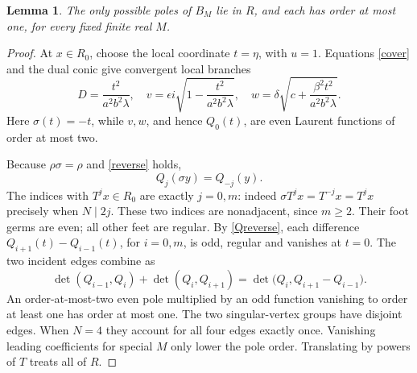 \documentclass[11pt]{article}
\newtheorem{lemma}{Lemma}
\begin{document}
\begin{lemma}\label{polesB}
The only possible poles of \(B_M\) lie in \(R\), and each has order
at most one, for every fixed finite real \(M\).
\end{lemma}
\begin{proof}
At \(x\in R_0\), choose the local coordinate \(t=\eta\), with \(u=1\).
Equations \eqref{cover} and the dual conic give convergent local branches
\[
 D=\frac{t^2}{a^2b^2\lambda},\quad
 v=\epsilon i\sqrt{1-\frac{t^2}{a^2b^2\lambda}},\quad
 w=\delta\sqrt{c+\frac{\beta^2t^2}{a^2b^2\lambda}}.
\]
Here \(\sigma(t)=-t\), while \(v,w\), and hence \(Q_0(t)\),
are even Laurent functions of order at most two.

Because \(\rho\sigma=\rho\) and \eqref{reverse} holds,
\begin{equation}\label{Qreverse}
 Q_j(\sigma y)=Q_{-j}(y).
\end{equation}
The indices with \(T^jx\in R_0\) are exactly \(j=0,m\):
indeed \(\sigma T^jx=T^{-j}x=T^jx\) precisely when \(N\mid2j\).
These two indices are nonadjacent, since \(m\ge2\).
Their foot germs are even; all other feet are regular.
By \eqref{Qreverse}, each difference
\(Q_{i+1}(t)-Q_{i-1}(t)\), for \(i=0,m\), is odd, regular
and vanishes at \(t=0\). The two incident edges combine as
\[
 \det(Q_{i-1},Q_i)+\det(Q_i,Q_{i+1})
 =\det\bigl(Q_i,Q_{i+1}-Q_{i-1}\bigr).
\]
An order-at-most-two even pole multiplied by an odd function vanishing
to order at least one has order at most one.
The two singular-vertex groups have disjoint edges.
When \(N=4\) they account for all four edges exactly once.
Vanishing leading coefficients for special \(M\) only lower the
pole order. Translating by powers of \(T\) treats all of \(R\).
\end{proof}
\end{document}
